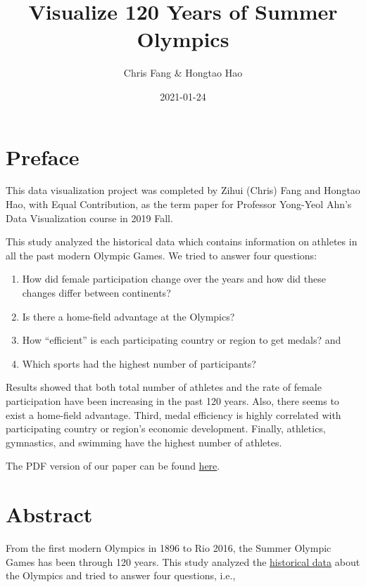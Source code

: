 \documentclass[
]{article}
\title{Visualize 120 Years of Summer Olympics}
\author{Chris Fang \& Hongtao Hao}
\date{2021-01-24}
\begin{document}
\maketitle

{
\setcounter{tocdepth}{2}
\tableofcontents
}
\hypertarget{preface}{%
\section*{Preface}\label{preface}}

This data visualization project was completed by Zihui (Chris) Fang and Hongtao Hao, with Equal Contribution, as the term paper for Professor Yong-Yeol Ahn's Data Visualization course in 2019 Fall.

This study analyzed the historical data which contains information on athletes in all the past modern Olympic Games. We tried to answer four questions:

\begin{enumerate}
\def\labelenumi{\arabic{enumi}.}
\item
  How did female participation change over the years and how did these changes differ between continents?
\item
  Is there a home-field advantage at the Olympics?
\item
  How ``efficient'' is each participating country or region to get medals? and
\item
  Which sports had the highest number of participants?
\end{enumerate}

Results showed that both total number of athletes and the rate of female participation have been increasing in the past 120 years. Also, there seems to exist a home-field advantage. Third, medal efficiency is highly correlated with participating country or region's economic development. Finally, athletics, gymnastics, and swimming have the highest number of athletes.

The PDF version of our paper can be found \href{_book/olymvis-bookdown.pdf}{here}.

\hypertarget{abstract}{%
\section*{Abstract}\label{abstract}}

From the first modern Olympics in 1896 to Rio 2016, the Summer Olympic Games has been through 120 years. This study analyzed the \href{https://github.com/rgriff23/Olympic_history}{historical data} about the Olympics and tried to answer four questions, i.e.,
\end{document}
